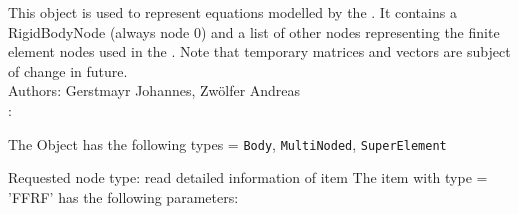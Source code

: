 \ei

%
\newpage


\label{sec:item:ObjectFFRF}
This object is used to represent equations modelled by the . It contains a RigidBodyNode (always node 0) and a list of other nodes representing the finite element nodes used in the . Note that temporary matrices and vectors are subject of change in future.
\vspace{12pt}\\

\noindent Authors: Gerstmayr Johannes, Zw\"olfer Andreas
\vspace{12pt}\\

\noindent {}:
\bi
  \item The Object has the following types = \texttt{Body}, \texttt{MultiNoded}, \texttt{SuperElement}
  \item Requested node type: read detailed information of item
\ei\vspace{12pt} \noindent 
The item  with type = 'FFRF' has the following parameters:
\vspace{-0.5cm}\\
\vspace{-0.5cm}\\
